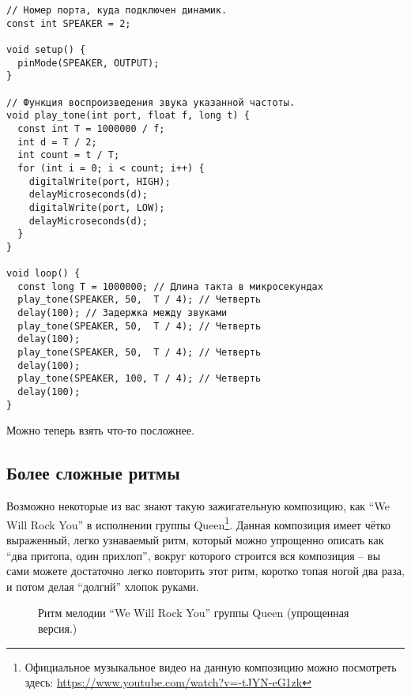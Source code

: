 \documentclass[../sparc.tex]{subfiles}
\begin{document}
\begin{verbatim}
// Номер порта, куда подключен динамик.
const int SPEAKER = 2;

void setup() {
  pinMode(SPEAKER, OUTPUT);
}

// Функция воспроизведения звука указанной частоты.
void play_tone(int port, float f, long t) {
  const int T = 1000000 / f;
  int d = T / 2;
  int count = t / T;
  for (int i = 0; i < count; i++) {
    digitalWrite(port, HIGH);
    delayMicroseconds(d);
    digitalWrite(port, LOW);
    delayMicroseconds(d);
  }
}

void loop() {
  const long T = 1000000; // Длина такта в микросекундах
  play_tone(SPEAKER, 50,  T / 4); // Четверть
  delay(100); // Задержка между звуками
  play_tone(SPEAKER, 50,  T / 4); // Четверть
  delay(100);
  play_tone(SPEAKER, 50,  T / 4); // Четверть
  delay(100);
  play_tone(SPEAKER, 100, T / 4); // Четверть
  delay(100);
}
\end{verbatim}

Можно теперь взять что-то посложнее.

\subsection{Более сложные ритмы}

Возможно некоторые из вас знают такую зажигательную композицию, как ``We Will
Rock You'' в исполнении группы Queen\footnote{Официальное музыкальное видео на
данную композицию можно посмотреть здесь:
\url{https://www.youtube.com/watch?v=-tJYN-eG1zk}}. Данная композиция имеет
чётко выраженный, легко узнаваемый ритм, который можно упрощенно описать как
``два притопа, один прихлоп'', вокруг которого строится вся композиция -- вы сами
можете достаточно легко повторить этот ритм, коротко топая ногой два раза, и
потом делая ``долгий'' хлопок руками.

\begin{figure}[ht]
  \centering
  \caption{Ритм мелодии ``We Will Rock You'' группы Queen (упрощенная версия.)}
  \label{fig:queen-we-will-rock-you-rhythm-1}
\end{figure}
\end{document}
